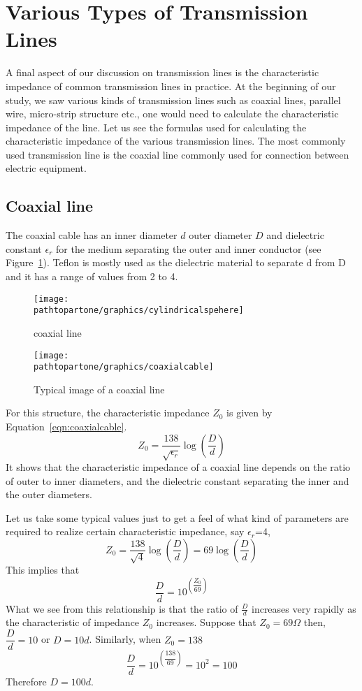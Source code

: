 \section{Various Types of Transmission Lines}\label{lec:lec15}
A final aspect of our discussion on transmission lines is the characteristic impedance of common transmission lines in practice. At the beginning of our study, we saw various kinds of transmission lines such as coaxial lines, parallel wire, micro-strip structure etc., one would need to calculate the characteristic impedance of the line. Let us see the formulas used for calculating the characteristic impedance of the various transmission lines. The most commonly used transmission line is the coaxial line commonly used for connection between electric equipment.

\subsection{Coaxial line}
The coaxial cable has an inner diameter $d$ outer diameter $D$ and dielectric constant $\epsilon_r$ for the medium separating the outer and inner conductor (see Figure~\ref{fig:coaxialcable1}). Teflon is mostly used as the dielectric material to separate d from D and it has a range of values from 2 to 4.
\begin{figure}[h]
\centering
\texttt{[image: \\pathtopartone/graphics/cylindricalspehere]}
\caption{coaxial line}
\label{fig:coaxialcable1}
\end{figure}
\begin{figure}[h]
\centering
\texttt{[image: \\pathtopartone/graphics/coaxialcable]}
\caption{Typical image of a coaxial line}
\end{figure}

For this structure, the characteristic impedance $Z_0$ is given by Equation~\eqref{eqn:coaxialcable}.
\begin{equation}
Z_0 =\frac{138}{\sqrt{\epsilon_r}}\log(\dfrac{D}{d})
\label{eqn:coaxialcable}
\end{equation}
It shows that the characteristic impedance of a coaxial line depends on the ratio of outer to inner diameters, and the dielectric constant separating the inner and the outer diameters.

Let us take some typical values just to get a feel of what kind of parameters are required to realize certain characteristic impedance, say $\epsilon_r$=4, 
\begin{dmath*}
Z_0 =\frac{138}{\sqrt{4}}\log(\dfrac{D}{d})
= 69\log(\dfrac{D}{d})
\end{dmath*}
This implies that
\begin{dmath*}
\frac{D}{d}=10^{\left(\dfrac{Z_0 }{69}\right)}
\end{dmath*}
What we see from this relationship is that the ratio of $\frac{D}{d}$ increases very rapidly as the characteristic of impedance $Z_0 $ increases. Suppose that $Z_0 = 69\varOmega$ then, $\dfrac{D}{d}= 10$ or $D=10d$. Similarly, when $Z_0 = 138$
\begin{dmath*}
\dfrac{D}{d}=10^{\left(\dfrac{138}{69}\right)}=10^{2}=100
\end{dmath*}
Therefore $D=100d$.

